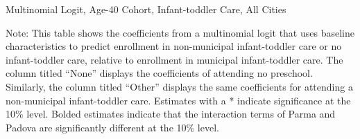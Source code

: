 \begin{table}[H]
\centering
\caption{Multinomial Logit, Age-40 Cohort,  Infant-toddler Care,  All Cities} \label{mlogit_coeff_asilo_age40}
\begin{threeparttable}

\begin{tablenotes}
\footnotesize\raggedright{Note: This table shows the coefficients from a multinomial logit that uses baseline characteristics to predict enrollment in non-municipal infant-toddler care or no infant-toddler care, relative to enrollment in municipal infant-toddler care. The column titled ``None'' displays the coefficients of attending no preschool. Similarly, the column titled ``Other'' displays the same coefficients for attending a non-municipal infant-toddler care. Estimates with a * indicate significance at the 10\% level. Bolded  estimates indicate that the interaction terms of Parma and Padova are significantly different at the 10\% level.}
\end{tablenotes}
\end{threeparttable}
\end{table}


